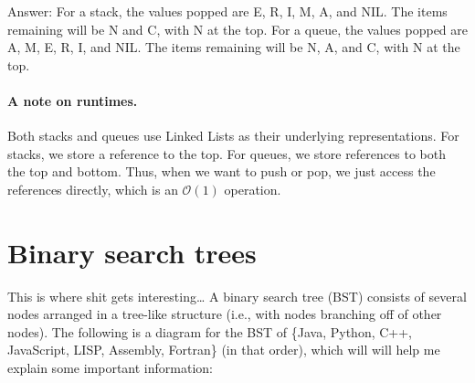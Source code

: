 \documentclass[10pt]{article}
\begin{document}
Answer: For a stack, the values popped are E, R, I, M, A, and NIL.
The items remaining will be N and C, with N at the top.
For a queue, the values popped are A, M, E, R, I, and NIL.
The items remaining will be N, A, and C, with N at the top.

\paragraph{A note on runtimes.}
Both stacks and queues use Linked Lists as their underlying representations.
For stacks, we store a reference to the top.
For queues, we store references to both the top and bottom.
Thus, when we want to push or pop, we just access the references directly,
which is an $\mathcal{O}(1)$ operation.


\section{Binary search trees}
This is where shit gets interesting\ldots
 A binary search tree (BST) consists of several nodes arranged in a tree-like
structure (i.e., with nodes branching off of other nodes).
The following is a diagram for the BST of \{Java, Python, C++, JavaScript,
LISP, Assembly, Fortran\} (in that order),
which will will help me explain some important information:
\begin{center}
\end{center}
\end{document}
